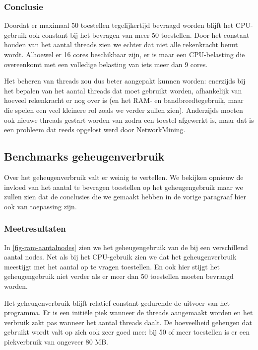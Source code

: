 \subsubsection{Conclusie}

Doordat er maximaal 50 toestellen tegelijkertijd bevraagd worden blijft het CPU-gebruik ook constant bij het bevragen van meer 50 toestellen.
Door het constant houden van het aantal threads zien we echter dat niet alle rekenkracht benut wordt.
Alhoewel er 16 cores beschikbaar zijn, er is maar een CPU-belasting die overeenkomt met een volledige belasting van iets meer dan 9 cores.

Het beheren van threads zou dus beter aangepakt kunnen worden:
enerzijds bij het bepalen van het aantal threads dat moet gebruikt worden, afhankelijk van hoeveel rekenkracht er nog over is
(en het RAM- en bandbreedtegebruik, maar die spelen een veel kleinere rol zoals we verder zullen zien).
Anderzijds moeten ook nieuwe threads gestart worden van zodra een toestel afgewerkt is,
maar dat is een probleem dat reeds opgelost werd door NetworkMining.

\subsection{Benchmarks geheugenverbruik}
\label{benchmarks-geheugengebruik}

Over het geheugenverbruik valt er weinig te vertellen.
We bekijken opnieuw de invloed van het aantal te bevragen toestellen op het geheugengebruik maar
we zullen zien dat de conclusies die we gemaakt hebben in de vorige paragraaf hier ook van toepassing zijn.

\subsubsection{Meetresultaten}

In \cref{fig-ram-aantalnodes} zien we het geheugengebruik van de \nwmretriever{} bij een verschillend aantal nodes.
Net als bij het CPU-gebruik zien we dat het geheugenverbruik meestijgt met het aantal op te vragen toestellen.
En ook hier stijgt het geheugengebruik niet verder als er meer dan 50 toestellen moeten bevraagd worden.

Het geheugenverbruik blijft relatief constant gedurende de uitvoer van het programma.
Er is een initiële piek wanneer de threads aangemaakt worden en het verbruik zakt pas wanneer het aantal threads daalt.
De hoeveelheid geheugen dat gebruikt wordt valt op zich ook zeer goed mee: bij 50 of meer toestellen is er een piekverbruik van ongeveer 80 MB.

